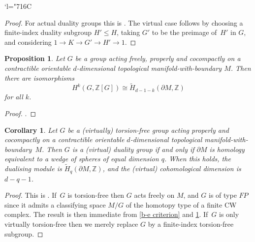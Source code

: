 \documentclass[11pt]{article}
\newcommand{\Changelback}{\mathcode`l="716C}
\theoremstyle{plain}
\newtheorem{prop}[thm]{Proposition}
\newtheorem{cor}[thm]{Corollary}
\theoremstyle{definition}
\newcommand{\Z}{\mathbb Z}
\begin{document}
\Changelback

\begin{proof}For actual duality groups this is \cite[Th.\,3.5]{be}. The virtual case follows by choosing a finite-index duality subgroup $H' \leq H$, taking $G'$ to be the preimage of~$H'$ in $G$, and considering $1 \to K \to G' \to H' \to 1$.
\end{proof}

\begin{prop}\label{action}
Let $G$ be a group acting freely, properly and cocompactly on a contractible orientable $d$-dimensional topological manifold-with-boundary $M$. Then there are isomorphisms
\[
H^k(G,\Z[G]) \cong \widetilde H_{d-1-k}(\partial M,\Z)
\]
for all $k$.
\end{prop}

\begin{proof}
\cite[\S 6.4]{be}.
\end{proof}

\begin{cor}\label{criterion}
Let $G$ be a (virtually) torsion-free group acting properly and cocompactly on a contractible orientable $d$-dimensional topological manifold-with-boundary~$M$. Then $G$ is a (virtual) duality group if and only if $\partial M$ is homology equivalent to a wedge of spheres of equal dimension $q$. When this holds, the dualising module is $\widetilde H_q(\partial M,\Z)$, and the (virtual) cohomological dimension is $d-q-1$.
\end{cor}

\begin{proof}This is \cite[Th.\,6.2]{be}. If~$G$ is torsion-free then $G$ acts freely on $M$, and $G$ is of type $\mathit{FP}$ since it admits a classifying space $M/G$ of the homotopy type of a finite CW complex. The result is then immediate from \cref{b-e criterion} and \cref{action}. If~$G$ is only virtually torsion-free then we merely replace $G$ by a finite-index torsion-free subgroup.
\end{proof}
\end{document}
